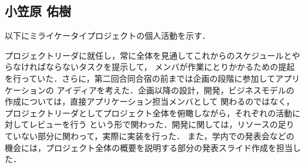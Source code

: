 \subsection{小笠原 佑樹}

以下にミライケータイプロジェクトの個人活動を示す．

プロジェクトリーダに就任し，常に全体を見通してこれからのスケジュールとやらなければならないタスクを提示して，
メンバが作業にとりかかるための提起を行っていた．さらに，第二回合同合宿の前までは企画の段階に参加してアプリケーションの
アイディアを考えた．企画以降の設計，開発，ビジネスモデルの作成については，直接アプリケーション担当メンバとして
関わるのではなく，プロジェクトリーダとしてプロジェクト全体を俯瞰しながら，それぞれの活動に対してレビューを行う
という形で関わった．開発に関しては，リソースの足りていない部分に関わって，実際に実装を行った．
また，学内での発表会などの機会には，プロジェクト全体の概要を説明する部分の発表スライド作成を担当した．


